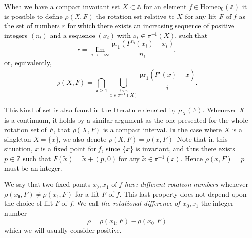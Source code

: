 \documentclass[12pt,a4paper]{amsart}
\theoremstyle{definition}
\theoremstyle{remark}
\newcommand{\Z}{\mathbb{Z}}
\newcommand{\homeo}{\mathrm{Homeo}_0(\A)}
\newcommand{\A}{\mathbb{A}}
\begin{document}
\smallskip

When we have a compact invariant set $X\subset \A$ for an element $f\in\homeo$
it is possible to define $\rho(X,F)$ the rotation set relative to $X$ for any lift $F$ of $f$ \textcolor{black}{ as the set of numbers $r$ for which there exists an increasing sequence of positive integers $(n_i)$ and a sequence $(x_i)$ with $x_i \in \pi^{-1}(X)$, such that 
$$r=\lim_{i\to+\infty} \frac{\mathrm{pr}_1(F^{n_i}(x_i)-x_i)}{n_i},$$
or, equivalently, 
$$\rho(X,F)=\bigcap_{n\ge 1}\overline{\bigcup_{\stackrel{i\ge n}{x\in\pi^{-1}(X)}}\frac{\mathrm{pr}_1(F^{i}(x)-x)}{i}}.$$}

This kind of set is also found in the literature denoted by $\rho_X(F)$. Whenever $X$ is a continuum, it holds by a similar argument as the one presented for the whole rotation set of $F$, that $\rho(X,F)$ is a compact interval. In the case where $X$ is a singleton $X=\{x\}$, we also denote
$\rho(X,F)=\rho(x,F)$. Note that in this situation, $x$ is a fixed point for $f$, \textcolor{black}{since $\{x\}$ is invariant, and thus there exists $p\in\Z$ such that $F(\tilde x)=\tilde x+(p,0)$ for any $\tilde x\in\pi^{-1}(x)$. Hence $\rho(x,F)=p$ must be an integer.} 

We say that two fixed points $x_0,x_1$ of $f$ \emph{have different rotation numbers} whenever $\rho(x_0,F)\neq\rho(x_1,F)$ for a lift $F$ of $f$. This last property does not depend upon the choice of lift $F$ of $f$. We call \emph{the rotational difference of $x_0,x_1$}
the integer number
$$\rho=\rho(x_1,F)-\rho(x_0,F)$$
which we will usually consider positive.
\end{document}
